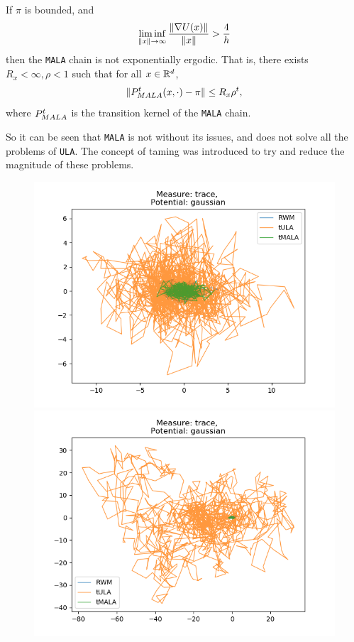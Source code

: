 \begin{theorem}
	If \(\pi\) is bounded, and
		\[\liminf_{\|x\|\to \infty} \frac{\|\nabla U(x)\|}{\|x\|} > \frac{4}{h}\]
	then the \texttt{MALA} chain is not exponentially ergodic. That is, there exists \(R_x <\infty, \rho<1\) such that for all \(x\in \mathbb{R}^d\),
	\[\|P^t_{\tiny \sc MALA}(x,\cdot) - \pi \| \leq R_x\rho^t,\]
	where \(P^t_{\tiny \sc MALA}\) is the transition kernel of the \texttt{MALA} chain.
\end{theorem}
So it can be seen that \texttt{MALA} is not without its issues, and does not solve all the problems of \texttt{ULA}. The concept of taming was introduced to try and reduce the magnitude of these problems.
\begin{figure}[H]
\centering
  \begin{minipage}[b]{0.49\textwidth}
  \centering
    \includegraphics[width=\textwidth]{Figures/tula_tmala_step_1.png}
  \end{minipage} %
  \begin{minipage}[b]{0.49\textwidth}
  \centering
    \includegraphics[width=\textwidth]{Figures/tula_tmala_step_10.png}

\end{minipage}
\end{figure}

